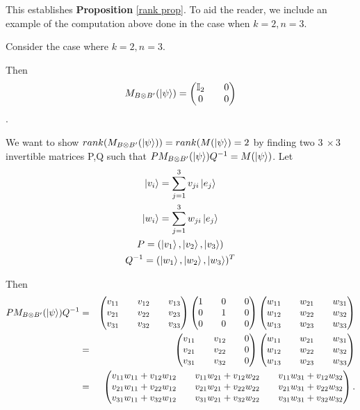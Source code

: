 This establishes {\bf{Proposition}} \ref{rank prop}. To aid the reader, we include an example of the computation above done in the case when $k=2, n=3$.
\begin{example}
Consider the case where $k=2, n=3$.

Then 
$$M_{B \otimes B'}(\ket{\psi})=\begin{pmatrix}
\mathbb{I}_2 && 0 \\
0 && 0
\end{pmatrix}$$.

We want to show $rank(M_{B \otimes B'}(\ket{\psi}))=rank(M(\ket{\psi})=2$ by finding two $3\  \times 3$ invertible matrices P,Q such that $PM_{B \otimes B'}(\ket{\psi})Q^{-1}=M(\ket{\psi})$.
Let
\begin{gather*}
\ket{v_i}=\sum_{j=1}^3 v_{ji}\ket{e_j}\\
\ket{w_i}=\sum_{j=1}^3 w_{ji}\ket{e_j}\\
P=(\ket{v_1}, \ket{v_2}, \ket{v_3})\\
Q^{-1}=(\ket{w_1}, \ket{w_2}, \ket{w_3})^T
\end{gather*}

Then
\begin{eqnarray*}
P M_{B \otimes B'}(\ket{\psi}) Q^{-1}&=&\begin{pmatrix}
v_{11} && v_{12} && v_{13}\\
v_{21} && v_{22} && v_{23}\\
v_{31} && v_{32} && v_{33}
\end{pmatrix}
\begin{pmatrix}
1 && 0 && 0\\
0 && 1 && 0\\
0 && 0 && 0\\
\end{pmatrix}
\begin{pmatrix}
w_{11} && w_{21} && w_{31}\\
w_{12} && w_{22} && w_{32}\\
w_{13} && w_{23} && w_{33}
\end{pmatrix}\\
&=&\begin{pmatrix}
v_{11} && v_{12} && 0\\
v_{21} && v_{22} && 0\\
v_{31} && v_{32} && 0
\end{pmatrix}
\begin{pmatrix}
w_{11} && w_{21} && w_{31}\\
w_{12} && w_{22} && w_{32}\\
w_{13} && w_{23} && w_{33}
\end{pmatrix}\\
&=&\begin{pmatrix}
v_{11}w_{11}+v_{12}w_{12} && v_{11}w_{21}+v_{12}w_{22} && v_{11}w_{31}+v_{12}w_{32}\\
v_{21}w_{11}+v_{22}w_{12} && v_{21}w_{21}+v_{22}w_{22} && v_{21}w_{31}+v_{22}w_{32} \\
v_{31}w_{11}+v_{32}w_{12} && v_{31}w_{21}+v_{32}w_{22} && v_{31}w_{31}+v_{32}w_{32} \\
\end{pmatrix}.
\end{eqnarray*}



\end{example}
